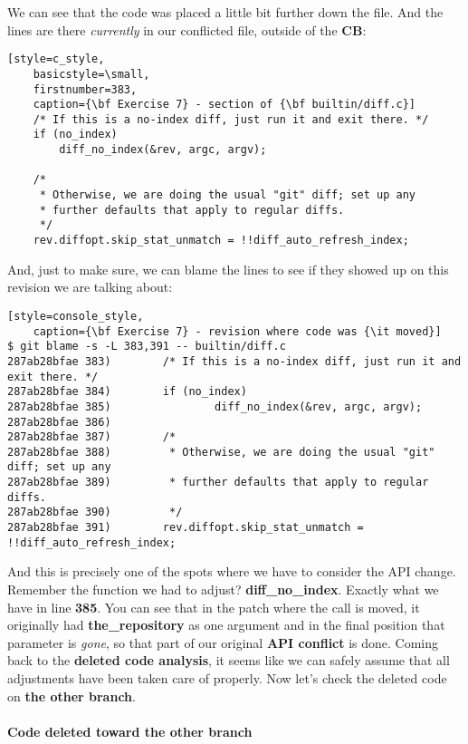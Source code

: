 We can see that the code was placed a little bit further down the file. And the lines are there {\it currently}
in our conflicted file, outside of the {\bf CB}:

\begin{lstlisting}[style=c_style,
	basicstyle=\small,
	firstnumber=383,
	caption={\bf Exercise 7} - section of {\bf builtin/diff.c}]
	/* If this is a no-index diff, just run it and exit there. */
	if (no_index)
		diff_no_index(&rev, argc, argv);

	/*
	 * Otherwise, we are doing the usual "git" diff; set up any
	 * further defaults that apply to regular diffs.
	 */
	rev.diffopt.skip_stat_unmatch = !!diff_auto_refresh_index;
\end{lstlisting}

And, just to make sure, we can blame the lines to see if they showed up on this revision we are talking about:

\begin{lstlisting}[style=console_style,
	caption={\bf Exercise 7} - revision where code was {\it moved}]
$ git blame -s -L 383,391 -- builtin/diff.c
287ab28bfae 383)        /* If this is a no-index diff, just run it and exit there. */
287ab28bfae 384)        if (no_index)
287ab28bfae 385)                diff_no_index(&rev, argc, argv);
287ab28bfae 386) 
287ab28bfae 387)        /*
287ab28bfae 388)         * Otherwise, we are doing the usual "git" diff; set up any
287ab28bfae 389)         * further defaults that apply to regular diffs.
287ab28bfae 390)         */
287ab28bfae 391)        rev.diffopt.skip_stat_unmatch = !!diff_auto_refresh_index;
\end{lstlisting}

And this is precisely one of the spots where we have to consider the API change. Remember the function
we had to adjust? {\bf diff\_no\_index}. Exactly what we have in line {\bf 385}. You can see that in the patch where the
call is moved, it originally had {\bf the\_repository} as one argument and in the final position that parameter is {\it gone},
so that part of our original {\bf API conflict} is done. Coming back to the {\bf deleted code analysis}, it seems like we
can safely assume that all adjustments have been taken care of properly. Now let's check the deleted code on {\bf the other
branch}.

\paragraph{Code deleted toward the other branch}

